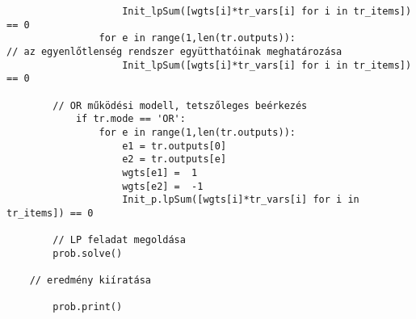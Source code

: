 \begin{verbatim}
                    Init_lpSum([wgts[i]*tr_vars[i] for i in tr_items]) == 0
                for e in range(1,len(tr.outputs)):
// az egyenlőtlenség rendszer együtthatóinak meghatározása 
                    Init_lpSum([wgts[i]*tr_vars[i] for i in tr_items]) == 0

		// OR működési modell, tetszőleges beérkezés
            if tr.mode == 'OR':
                for e in range(1,len(tr.outputs)):
                    e1 = tr.outputs[0]
                    e2 = tr.outputs[e]
                    wgts[e1] =  1
                    wgts[e2] =  -1
                    Init_p.lpSum([wgts[i]*tr_vars[i] for i in tr_items]) == 0
                    
        // LP feladat megoldása
        prob.solve()

	// eredmény kiíratása
	
        prob.print()
\end{verbatim}         

